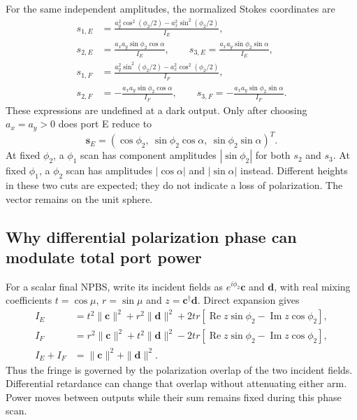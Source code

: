 For the same independent amplitudes, the normalized Stokes coordinates are
\begin{align}
s_{1,E}&=\frac{a_y^2\cos^2(\phi_2/2)-a_x^2\sin^2(\phi_2/2)}{I_E},\\
s_{2,E}&=\frac{a_xa_y\sin\phi_2\cos\alpha}{I_E},\qquad
s_{3,E}=\frac{a_xa_y\sin\phi_2\sin\alpha}{I_E},\\
s_{1,F}&=\frac{a_y^2\sin^2(\phi_2/2)-a_x^2\cos^2(\phi_2/2)}{I_F},\\
s_{2,F}&=-\frac{a_xa_y\sin\phi_2\cos\alpha}{I_F},\qquad
s_{3,F}=-\frac{a_xa_y\sin\phi_2\sin\alpha}{I_F}.
\end{align}
These expressions are undefined at a dark output. Only after choosing
$a_x=a_y>0$ does port E reduce to
\begin{equation}
\mathbf s_E=(\cos\phi_2,\ \sin\phi_2\cos\alpha,\ \sin\phi_2\sin\alpha)^T.
\end{equation}
At fixed $\phi_2$, a $\phi_1$ scan has component amplitudes
$|\sin\phi_2|$ for both $s_2$ and $s_3$. At fixed $\phi_1$, a $\phi_2$ scan
has amplitudes $|\cos\alpha|$ and $|\sin\alpha|$ instead. Different heights
in these two cuts are expected; they do not indicate a loss of polarization.
The vector remains on the unit sphere.

\subsection{Why differential polarization phase can modulate total port power}
For a scalar final NPBS, write its incident fields as
$e^{i\phi_2}\mathbf c$ and $\mathbf d$, with real mixing coefficients
$t=\cos\mu$, $r=\sin\mu$ and $z=\mathbf c^\dagger\mathbf d$.
Direct expansion gives
\begin{align}
I_E&=t^2\|\mathbf c\|^2+r^2\|\mathbf d\|^2
+2tr[\operatorname{Re}z\sin\phi_2-\operatorname{Im}z\cos\phi_2],\\
I_F&=r^2\|\mathbf c\|^2+t^2\|\mathbf d\|^2
-2tr[\operatorname{Re}z\sin\phi_2-\operatorname{Im}z\cos\phi_2],\\
I_E+I_F&=\|\mathbf c\|^2+\|\mathbf d\|^2.
\end{align}
Thus the fringe is governed by the polarization overlap of the two incident
fields. Differential retardance can change that overlap without attenuating
either arm. Power moves between outputs while their sum remains fixed during
this phase scan.

